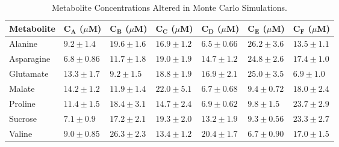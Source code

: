 \begin{table}[h!]
\caption{Metabolite Concentrations Altered in Monte Carlo Simulations.}
\begin{center}
\begin{tabular}{l | l l l l l l}
  \hline
  {\bf Metabolite} & $\mathbf{C_A}$ ($\mu$M) & $\mathbf{C_B}$ ($\mu$M) &
                     $\mathbf{C_C}$ ($\mu$M) & $\mathbf{C_D}$ ($\mu$M) &
                     $\mathbf{C_E}$ ($\mu$M) & $\mathbf{C_F}$ ($\mu$M) \\
  \hline
  Alanine    &  $9.2 \pm 1.4$    &  $19.6 \pm 1.6$    &  $16.9 \pm 1.2$  &
                $6.5 \pm 0.66$   &  $26.2 \pm 3.6$    &  $13.5 \pm 1.1$  \\
  Asparagine &  $6.8 \pm 0.86$   &  $11.7 \pm 1.8$    &  $19.0 \pm 1.9$  &
               $14.7 \pm 1.2$    &  $24.8 \pm 2.6$    &  $17.4 \pm 1.0$  \\
  Glutamate  & $13.3 \pm 1.7$    &   $9.2 \pm 1.5$    &  $18.8 \pm 1.9$  &
               $16.9 \pm 2.1$    &  $25.0 \pm 3.5$    &   $6.9 \pm 1.0$  \\
  Malate     & $14.2 \pm 1.2$    &  $11.9 \pm 1.4$    &  $22.0 \pm 5.1$  &
                $6.7 \pm 0.68$   &   $9.4 \pm 0.72$   &  $18.0 \pm 2.4$  \\
  Proline    & $11.4 \pm 1.5$    &  $18.4 \pm 3.1$    &  $14.7 \pm 2.4$  &
                $6.9 \pm 0.62$   &   $9.8 \pm 1.5$    &  $23.7 \pm 2.9$  \\
  Sucrose    &  $7.1 \pm 0.9$    &  $17.2 \pm 2.1$    &  $19.3 \pm 2.0$  &
               $13.2 \pm 1.9$    &   $9.3 \pm 0.56$   &  $23.3 \pm 2.7$  \\
  Valine     &  $9.0 \pm 0.85$   &  $26.3 \pm 2.3$    &  $13.4 \pm 1.2$  &
               $20.4 \pm 1.7$    &   $6.7 \pm 0.90$   &  $17.0 \pm 1.5$  \\
\end{tabular}
\end{center}
\end{table}

